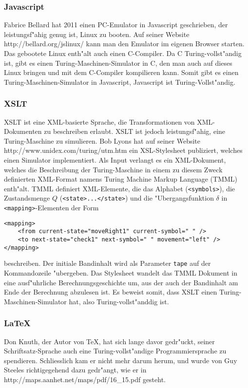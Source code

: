 \subsubsection{Javascript}
Fabrice Bellard hat 2011 einen PC-Emulator in Javascript geschrieben, der
leistungsf"ahig genug ist, Linux zu booten. Auf seiner Website 
http://bellard.org/jslinux/ kann man den Emulator im eigenen Browser 
starten. Das gebootete Linux enth"alt auch einen C-Compiler. Da C
Turing-vollst"andig ist, gibt es einen Turing-Maschinen-Simulator in
C, den man auch auf dieses Linux bringen und mit dem C-Compiler
kompilieren kann. Somit gibt es einen Turing-Maschinen-Simulator in
Javascript, Javascript ist Turing-Vollst"andig.

\subsubsection{XSLT}
XSLT ist eine XML-basierte Sprache, die Transformationen von XML-Dokumenten
zu beschreiben erlaubt. XSLT ist jedoch leistungsf"ahig, eine Turing-Maschine
zu simulieren. Bob Lyons hat auf seiner Website
http://www.unidex.com/turing/utm.htm ein XSL-Stylesheet publiziert,
welches einen Simulator implementiert. Als Input verlangt es
ein
XML-Dokument, welches die Beschreibung der Turing-Maschine in einem
zu diesem Zweck definierten XML-Format namens Turing Machine Markup
Language (TMML) enth"alt. TMML definiert XML-Elemente, die das Alphabet
(\verb+<symbols>+),
die Zustandsmenge $Q$ (\verb+<state>...</state>+)
und die "Ubergangsfunktion $\delta$ in \verb+<mapping>+-Elementen
der Form
\begin{verbatim}
<mapping>
    <from current-state="moveRight1" current-symbol=" " />
    <to next-state="check1" next-symbol=" " movement="left" />
</mapping>
\end{verbatim}
beschreiben. Der initiale Bandinhalt wird als Parameter \verb+tape+
auf der Kommandozeile "ubergeben.
Das Stylesheet wandelt das TMML Dokument in eine ausf"uhrliche
Berechnungsgeschichte um, aus der auch der Bandinhalt am Ende der Berechnung
abzulesen ist. Es beweist somit, dass XSLT einen Turing-Maschinen-Simulator
hat, also Turing-vollst"anddig ist.

\subsubsection{\LaTeX}
Don Knuth, der Autor von \TeX, hat sich lange davor gedr"uckt, seiner
Schriftsatz-Sprache auch eine Turing-vollst"andige Programmiersprache
zu spendieren. Schliesslich kam er nicht mehr darum herum, und wurde
von Guy Steeles richtigegehend dazu gedr"angt, wie er in
http://maps.aanhet.net/maps/pdf/16\_15.pdf
gesteht.

